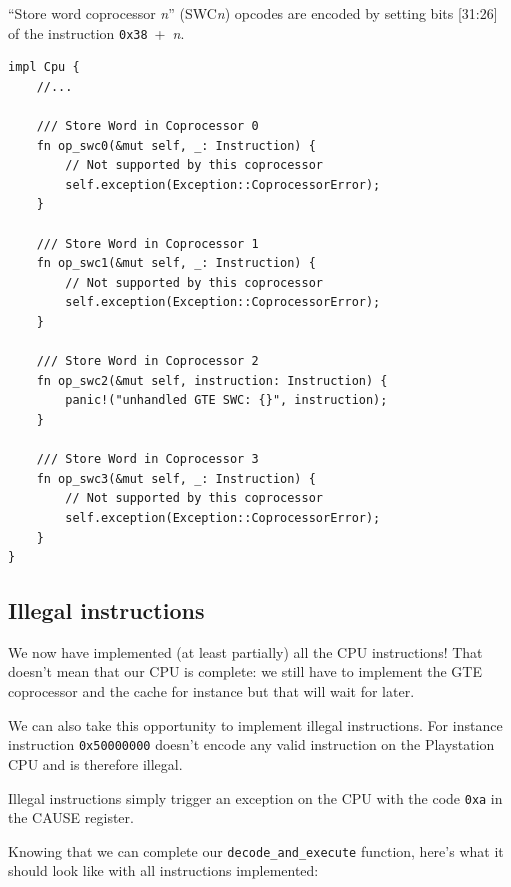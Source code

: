 \documentclass[a4paper]{article}
\newcommand{\code}[1] {\texttt{#1}}
\begin{document}
``Store word coprocessor \emph{n}'' (SWC\emph{n}) opcodes are encoded
by setting bits [31:26] of the instruction \code{0x38}~+~\emph{n}.

\begin{lstlisting}
impl Cpu {
    //...

    /// Store Word in Coprocessor 0
    fn op_swc0(&mut self, _: Instruction) {
        // Not supported by this coprocessor
        self.exception(Exception::CoprocessorError);
    }

    /// Store Word in Coprocessor 1
    fn op_swc1(&mut self, _: Instruction) {
        // Not supported by this coprocessor
        self.exception(Exception::CoprocessorError);
    }

    /// Store Word in Coprocessor 2
    fn op_swc2(&mut self, instruction: Instruction) {
        panic!("unhandled GTE SWC: {}", instruction);
    }

    /// Store Word in Coprocessor 3
    fn op_swc3(&mut self, _: Instruction) {
        // Not supported by this coprocessor
        self.exception(Exception::CoprocessorError);
    }
}
\end{lstlisting}

\subsection{Illegal instructions}

We now have implemented (at least partially) all the CPU instructions!
That doesn't mean that our CPU is complete: we still have to implement
the GTE coprocessor and the cache for instance but that will wait for
later.

We can also take this opportunity to implement illegal
instructions. For instance instruction \code{0x50000000} doesn't
encode any valid instruction on the Playstation CPU and is therefore
illegal.

Illegal instructions simply trigger an exception on the CPU with the
code \code{0xa} in the CAUSE register.

Knowing that we can complete our \code{decode\_and\_execute} function,
here's what it should look like with all instructions implemented:
\end{document}
